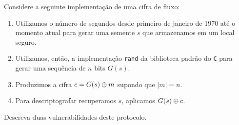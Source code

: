\begin{exercicio}
  Considere a seguinte implementação de uma cifra de fluxo:
\begin{enumerate}
\item Utilizamos o número de segundos desde primeiro de janeiro de 1970 até o momento atual para gerar uma semente $s$ que armazenamos em um local seguro.
\item Utilizamos, então, a implementação {\tt rand} da biblioteca padrão do {\tt C} para gerar uma sequência de $n$ bits $G(s)$.
\item Produzimos a cifra $c = G(s) \oplus m$ supondo que $|m| = n$.
\item Para descriptografar recuperamos $s$, aplicamos $G(s) \oplus c$.
\end{enumerate}

  Descreva duas vulnerabilidades deste protocolo.
\end{exercicio}


